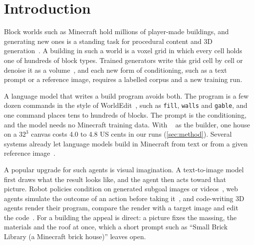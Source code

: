 \section{Introduction}
\label{sec:intro}

Block worlds such as Minecraft hold millions of player-made buildings, and generating new ones is
a standing task for procedural content and 3D generation~\citep{salge2018gdmc,chen2019voxelcnn,merino2026dreamcubed}.
A building in such a world is a voxel grid in which every cell holds one of hundreds of block
types. Trained generators write this grid cell by cell or denoise it as a
volume~\citep{chen2019voxelcnn,merino2026dreamcubed,pun2025brickgpt}, and each new form of
conditioning, such as a text prompt or a reference image, requires a labelled corpus and a new
training run.

A language model that writes a build program avoids both. The program is a few dozen commands
in the style of WorldEdit~\citep{worldedit}, such as \texttt{fill}, \texttt{walls} and
\texttt{gable}, and one command places tens to hundreds of blocks. The prompt is the conditioning,
and the model needs no Minecraft training data. With \gptmini{}~\citep{openai2025gpt5} as the
builder, one house on a $32^3$ canvas costs 4.0 to 4.8 US cents in our runs (\cref{sec:method}).
Several systems already let language models build in Minecraft from text or from a given
reference image~\citep{hu2024t2bm,chen2024apt,fu2026craftutopia,wei2025mineanybuild}.

A popular upgrade for such agents is visual imagination. A text-to-image model first draws what
the result looks like, and the agent then acts toward that picture. Robot policies
condition on generated subgoal images or videos~\citep{black2024susie,du2023unipi}, web agents
simulate the outcome of an action before taking it~\citep{gu2024webdreamer}, and code-writing
3D agents render their program, compare the render with a target image and edit the
code~\citep{yin2026viga,li2026legoanything}. For a building the appeal is direct: a picture fixes
the massing, the materials and the roof at once, which a short prompt such as
``Small Brick Library (a Minecraft brick house)'' leaves open.

